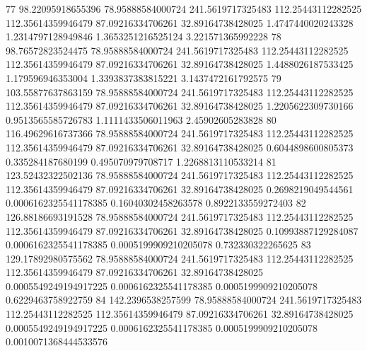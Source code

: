 {77 98.22095918655396 78.95888584000724 241.5619717325483 112.25443112282525 112.35614359946479 87.09216334706261 32.89164738428025 1.4747440020243328 1.2314797128949846 1.3653251216525124 3.221571365992228
78 98.76572823524475 78.95888584000724 241.5619717325483 112.25443112282525 112.35614359946479 87.09216334706261 32.89164738428025 1.4488026187533425 1.179596946353004 1.3393837383815221 3.1437472161792575
79 103.55877637863159 78.95888584000724 241.5619717325483 112.25443112282525 112.35614359946479 87.09216334706261 32.89164738428025 1.2205622309730166 0.9513565585726783 1.1111433506011963 2.45902605283828
80 116.49629616737366 78.95888584000724 241.5619717325483 112.25443112282525 112.35614359946479 87.09216334706261 32.89164738428025 0.6044898600805373 0.335284187680199 0.495070979708717 1.2268813110533214
81 123.52432322502136 78.95888584000724 241.5619717325483 112.25443112282525 112.35614359946479 87.09216334706261 32.89164738428025 0.2698219049544561 0.0006162325541178385 0.16040302458263578 0.8922133559272403
82 126.88186693191528 78.95888584000724 241.5619717325483 112.25443112282525 112.35614359946479 87.09216334706261 32.89164738428025 0.10993887129284087 0.0006162325541178385 0.0005199909210205078 0.732330322265625
83 129.17892980575562 78.95888584000724 241.5619717325483 112.25443112282525 112.35614359946479 87.09216334706261 32.89164738428025 0.0005549249194917225 0.0006162325541178385 0.0005199909210205078 0.6229463758922759
84 142.2396538257599 78.95888584000724 241.5619717325483 112.25443112282525 112.35614359946479 87.09216334706261 32.89164738428025 0.0005549249194917225 0.0006162325541178385 0.0005199909210205078 0.0010071368444533576
}\tableexpivwaitaicode
